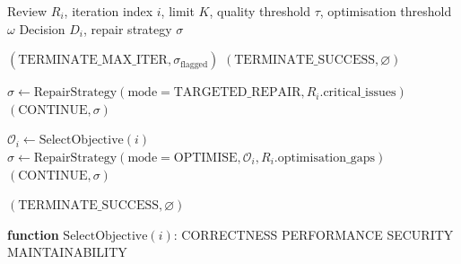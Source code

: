 \begin{algorithm}[htbp]
\caption{Multi-Objective Decision Mechanism}
\label{alg:decision}
\begin{algorithmic}[1]

\REQUIRE Review $R_i$, iteration index $i$, limit $K$, quality threshold $\tau$, optimisation threshold $\omega$
\ENSURE Decision $D_i$, repair strategy $\sigma$

\STATE {}

        \RETURN $(\text{TERMINATE\_MAX\_ITER}, \sigma_{\text{flagged}})$
    \ELSE
        \RETURN $(\text{TERMINATE\_SUCCESS}, \varnothing)$
    \ENDIF
\ENDIF

    \STATE $\sigma \leftarrow \text{RepairStrategy}(\text{mode} = \text{TARGETED\_REPAIR}, R_i.\text{critical\_issues})$
    \RETURN $(\text{CONTINUE}, \sigma)$
\ENDIF

    \STATE $\mathcal{O}_i \leftarrow \text{SelectObjective}(i)$
    \STATE $\sigma \leftarrow \text{RepairStrategy}(\text{mode} = \text{OPTIMISE}, \mathcal{O}_i, R_i.\text{optimisation\_gaps})$
    \RETURN $(\text{CONTINUE}, \sigma)$
\ENDIF

\RETURN $(\text{TERMINATE\_SUCCESS}, \varnothing)$

\STATE
\STATE {}
\STATE \textbf{function} $\text{SelectObjective}(i)$:
    \RETURN CORRECTNESS 
    \RETURN PERFORMANCE 
    \RETURN SECURITY 
\ELSE
    \RETURN MAINTAINABILITY 
\ENDIF

\end{algorithmic}
\end{algorithm}
